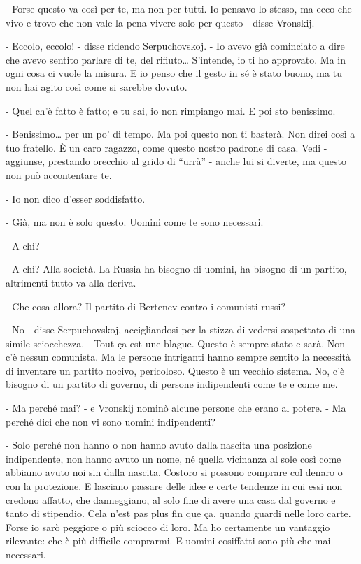 - Forse questo va così per te, ma non per tutti. Io pensavo lo stesso, ma ecco che vivo e trovo che non vale la pena vivere solo per questo - disse Vronskij. 

- Eccolo, eccolo! - disse ridendo Serpuchovskoj. - Io avevo già cominciato a dire che avevo sentito parlare di te, del rifiuto\ldots{} S'intende, io ti ho approvato. Ma in ogni cosa ci vuole la misura. E io penso che il gesto in sé è stato buono, ma tu non hai agito così come si sarebbe dovuto. 

- Quel ch'è fatto è fatto; e tu sai, io non rimpiango mai. E poi sto benissimo. 

- Benissimo\ldots{} per un po' di tempo. Ma poi questo non ti basterà. Non direi così a tuo fratello. È un caro ragazzo, come questo nostro padrone di casa. Vedi - aggiunse, prestando orecchio al grido di ``urrà'' - anche lui si diverte, ma questo non può accontentare te. 

- Io non dico d'esser soddisfatto. 

- Già, ma non è solo questo. Uomini come te sono necessari. 

- A chi? 

- A chi? Alla società. La Russia ha bisogno di uomini, ha bisogno di un partito, altrimenti tutto va alla deriva. 

- Che cosa allora? Il partito di Bertenev contro i comunisti russi? 

- No - disse Serpuchovskoj, accigliandosi per la stizza di vedersi sospettato di una simile sciocchezza. - Tout ça est une blague. Questo è sempre stato e sarà. Non c'è nessun comunista. Ma le persone intriganti hanno sempre sentito la necessità di inventare un partito nocivo, pericoloso. Questo è un vecchio sistema. No, c'è bisogno di un partito di governo, di persone indipendenti come te e come me. 

- Ma perché mai? - e Vronskij nominò alcune persone che erano al potere. - Ma perché dici che non vi sono uomini indipendenti? 

- Solo perché non hanno o non hanno avuto dalla nascita una posizione indipendente, non hanno avuto un nome, né quella vicinanza al sole così come abbiamo avuto noi sin dalla nascita. Costoro si possono comprare col denaro o con la protezione. E lasciano passare delle idee e certe tendenze in cui essi non credono affatto, che danneggiano, al solo fine di avere una casa dal governo e tanto di stipendio. Cela n'est pas plus fin que ça, quando guardi nelle loro carte. Forse io sarò peggiore o più sciocco di loro. Ma ho certamente un vantaggio rilevante: che è più difficile comprarmi. E uomini cosiffatti sono più che mai necessari. 

